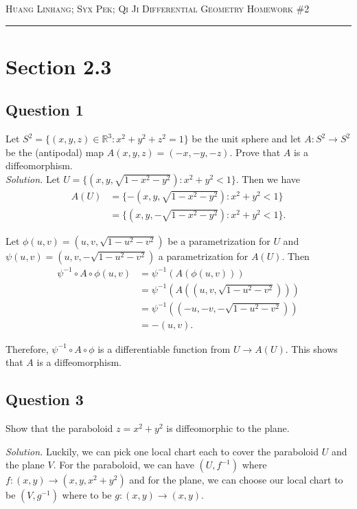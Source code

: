 \documentclass[12pt]{article}
\begin{document}
\thispagestyle{empty}

{\scshape Huang Linhang; Syx Pek; Qi Ji} \hfill {\scshape \large Differential Geometry} \hfill {\scshape Homework \#2}
 
\smallskip
\hrule
\bigskip

\section{Section 2.3}

\subsection*{Question 1}
Let $S^2 = \{(x,y,z) \in \mathbb{R}^3:x^2+y^2+z^2= 1\}$ be the unit sphere and let $A:S^2 \to S^2$ be the (antipodal) map $A(x,y, z) = (-x, -y, -z)$. Prove that $A$ is a diffeomorphism.\\

\textit{Solution.}
Let $U = \{(x,y,\sqrt{1-x^2-y^2}):x^2+y^2<1\}$. Then we have \begin{align*}
    A(U) &=\{-(x,y,\sqrt{1-x^2-y^2}):x^2+y^2<1\}\\
    &=\{(x,y,-\sqrt{1-x^2-y^2}):x^2+y^2<1\}.
\end{align*}

Let $\phi(u,v) = (u,v,\sqrt{1-u^2-v^2})$ be a parametrization for $U$ and $\psi(u,v) = (u,v,-\sqrt{1-u^2-v^2})$ a parametrization for $A(U)$. Then \begin{align*}
    \psi^{-1}\circ A\circ\phi(u,v) &= \psi^{-1}(A(\phi(u,v)))\\
    &= \psi^{-1}(A((u,v,\sqrt{1-u^2-v^2})))\\
    &= \psi^{-1}((-u,-v,-\sqrt{1-u^2-v^2}))\\
    &= -(u,v).
\end{align*}

Therefore, $\psi^{-1}\circ A\circ\phi$ is a differentiable function from $U\to A(U)$. This shows that $A$ is a diffeomorphism.

\subsection*{Question 3}

Show that the paraboloid $z = x^2 + y^2$
is diffeomorphic to the plane.

\textit{Solution.}  Luckily, we can pick one local chart each
to cover the paraboloid $U$ and the plane $V$. For the paraboloid, we can have $(U, f^{-1})$ where 
$f: (x, y) \to (x, y, x^2 + y^2)$ and for the plane, we can choose our local chart to be $(V, g^{-1})$ where 
to be $g: (x, y) \to (x, y).$
\end{document}
